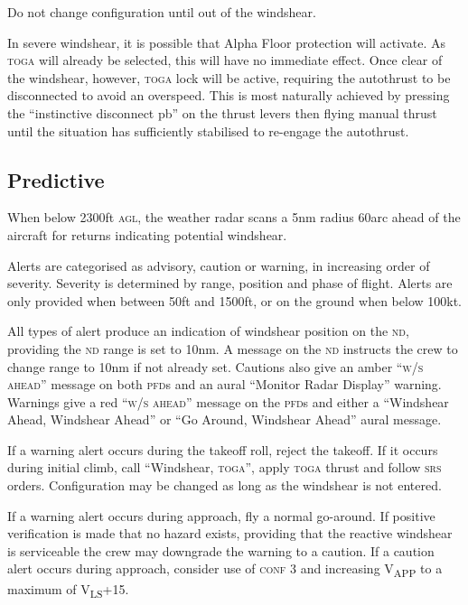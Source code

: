 \documentclass[a5paper,11pt,twoside]{book}
\newcommand{\inlcite}[1]{{\footnotesize\scshape\MakeLowercase{[#1]}}}
\newcommand{\multicite}[1]{%

  \nopagebreak
  \noindent{{\color{blue}\inlcite{#1}}}
}
\newcommand{\V}[1]{V\textsubscript{#1}}
\newcommand{\ac}[1]{{\scshape\MakeLowercase{#1}}}
\begin{document}
Do not change configuration until out of the windshear.

In severe windshear, it is possible that Alpha Floor protection will
activate. As \ac{TOGA} will already be selected, this will have no immediate
effect. Once clear of the windshear, however, \ac{TOGA} lock will be active,
requiring the autothrust to be disconnected to avoid an overspeed. This is most
naturally achieved by pressing the ``instinctive disconnect pb'' on the thrust
levers then flying manual thrust until the situation has sufficiently stabilised
to re-engage the autothrust.

\multicite{FCOM~PRO.AEP.SURV}

\subsection{Predictive}

When below 2300ft \ac{AGL}, the weather radar scans a 5nm radius 60\textdegree{
}arc ahead of the aircraft for returns indicating potential windshear.

Alerts are categorised as advisory, caution or warning, in increasing order of
severity. Severity is determined by range, position and phase of flight. Alerts
are only provided when between 50ft and 1500ft, or on the ground when below
100kt.

All types of alert produce an indication of windshear position on the \ac{ND},
providing the \ac{ND} range is set to 10nm. A message on the \ac{ND} instructs
the crew to change range to 10nm if not already set. Cautions also give an amber
``\ac{W/S AHEAD}'' message on both \ac{PFD}s and an aural ``Monitor Radar
Display'' warning. Warnings give a red ``\ac{W/S AHEAD}'' message on the
\ac{PFD}s and either a ``Windshear Ahead, Windshear Ahead'' or ``Go Around,
Windshear Ahead'' aural message.

If a warning alert occurs during the takeoff roll, reject the takeoff. If it
occurs during initial climb, call ``Windshear, \ac{TOGA}'', apply \ac{TOGA}
thrust and follow \ac{SRS} orders. Configuration may be changed as long as the
windshear is not entered.

If a warning alert occurs during approach, fly a normal go-around. If positive
verification is made that no hazard exists, providing that the reactive
windshear is serviceable the crew may downgrade the warning to a caution. If a
caution alert occurs during approach, consider use of \ac{CONF} 3 and increasing
\V{APP} to a maximum of \V{LS}+15.
\end{document}

